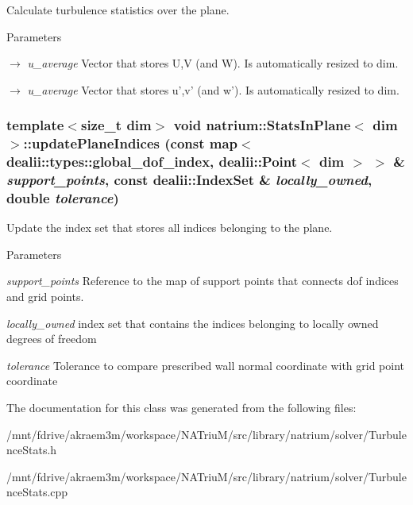 Calculate turbulence statistics over the plane. 
\begin{DoxyParams}{Parameters}
\item[\mbox{$\rightarrow$} {\em u\_\-average}]Vector that stores U,V (and W). Is automatically resized to dim. \item[\mbox{$\rightarrow$} {\em u\_\-average}]Vector that stores u',v' (and w'). Is automatically resized to dim. \end{DoxyParams}
\hypertarget{classnatrium_1_1StatsInPlane_aa6e53875ea989769eacbbb80bfd41fac}{
\subsubsection[{updatePlaneIndices}]{\setlength{\rightskip}{0pt plus 5cm}template$<$size\_\-t dim$>$ void {\bf natrium::StatsInPlane}$<$ dim $>$::updatePlaneIndices (const map$<$ dealii::types::global\_\-dof\_\-index, dealii::Point$<$ dim $>$ $>$ \& {\em support\_\-points}, \/  const dealii::IndexSet \& {\em locally\_\-owned}, \/  double {\em tolerance})}}
\label{classnatrium_1_1StatsInPlane_aa6e53875ea989769eacbbb80bfd41fac}


Update the index set that stores all indices belonging to the plane. 
\begin{DoxyParams}{Parameters}
\item[{\em support\_\-points}]Reference to the map of support points that connects dof indices and grid points. \item[{\em locally\_\-owned}]index set that contains the indices belonging to locally owned degrees of freedom \item[{\em tolerance}]Tolerance to compare prescribed wall normal coordinate with grid point coordinate \end{DoxyParams}


The documentation for this class was generated from the following files:\begin{DoxyCompactItemize}
\item 
/mnt/fdrive/akraem3m/workspace/NATriuM/src/library/natrium/solver/TurbulenceStats.h\item 
/mnt/fdrive/akraem3m/workspace/NATriuM/src/library/natrium/solver/TurbulenceStats.cpp\end{DoxyCompactItemize}
